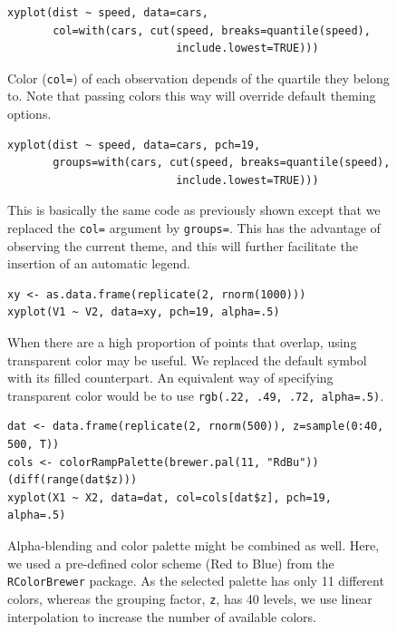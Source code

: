 \documentclass[a4paper,twoside]{book}
\newcounter{fig}
\newcommand{\img}[1]{\texttt{[image: \#1]}\stepcounter{fig}}
\renewcommand{\texttt}[1]{\lstinline{#1}}
\begin{document}
\begin{figure}[H]
\begin{lstlisting}
xyplot(dist ~ speed, data=cars, 
       col=with(cars, cut(speed, breaks=quantile(speed), 
                          include.lowest=TRUE)))
\end{lstlisting}
  \fcapside[\FBwidth] {\img{figs_lattice-crop}} {\caption*{Color
      (\texttt{col=}) of each observation depends of the quartile they
      belong to. Note that passing colors this way will override
      default theming options.}}
\end{figure}

\begin{figure}[H]
\begin{lstlisting}
xyplot(dist ~ speed, data=cars, pch=19,
       groups=with(cars, cut(speed, breaks=quantile(speed), 
                          include.lowest=TRUE)))
\end{lstlisting}
  \fcapside[\FBwidth] {\img{figs_lattice-crop}} {\caption*{This is
      basically the same code as previously shown except that we
      replaced the \texttt{col=} argument by \texttt{groups=}. This
      has the advantage of observing the current theme, and this will
      further facilitate the insertion of an automatic legend.}}
\end{figure}

\begin{figure}[H]
\begin{lstlisting}
xy <- as.data.frame(replicate(2, rnorm(1000)))
xyplot(V1 ~ V2, data=xy, pch=19, alpha=.5)
\end{lstlisting}
  \fcapside[\FBwidth] {\img{figs_lattice-crop}} {\caption*{When there
      are a high proportion of points that overlap, using transparent
      color may be useful. We replaced the default symbol with its
      filled counterpart. An equivalent way of specifying transparent
      color would be to use \texttt{rgb(.22, .49, .72, alpha=.5)}.}}
\end{figure}

\begin{figure}[H]
\begin{lstlisting}
dat <- data.frame(replicate(2, rnorm(500)), z=sample(0:40, 500, T))
cols <- colorRampPalette(brewer.pal(11, "RdBu"))(diff(range(dat$z)))
xyplot(X1 ~ X2, data=dat, col=cols[dat$z], pch=19, alpha=.5)
\end{lstlisting}
  \fcapside[\FBwidth] {\img{figs_lattice-crop}}
  {\caption*{Alpha-blending and color palette might be combined as
      well. Here, we used a pre-defined color scheme (Red to Blue)
      from the \texttt{RColorBrewer} package. As the selected palette
      has only 11 different colors, whereas the grouping factor,
      \texttt{z}, has 40 levels, we use linear interpolation to
      increase the number of available colors.}}
\end{figure}
\end{document}

